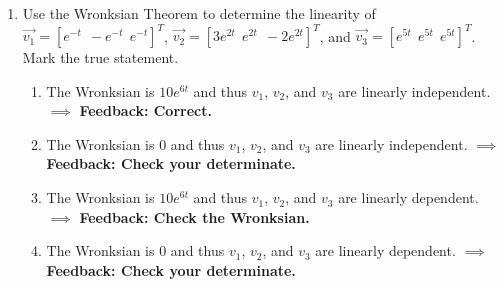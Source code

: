 \documentclass[11pt]{article}
\begin{document}
\begin{enumerate}
\begin{enumerate}
	\end{enumerate}
\newpage
	\item Use the Wronksian Theorem to determine the linearity of $\vec{v_1} = [e^{-t} \:\: -e^{-t} \:\: e^{-t}]^T$, $\vec{v_2} = [3e^{2t} \:\: e^{2t}\:\: -2e^{2t}]^T$, and $\vec{v_3} = [e^{5t} \:\: e^{5t}\:\:e^{5t}]^T$. Mark the true statement. 
	\begin{enumerate}
		\item The Wronksian is $10e^{6t}$ and thus $v_1$, $v_2$, and $v_3$ are linearly independent. $\implies$ \textbf{Feedback: Correct.}
		\item The Wronksian is $0$ and thus $v_1$, $v_2$, and $v_3$ are linearly independent. $\implies$ \textbf{Feedback: Check your determinate.}
		\item The Wronksian is $10e^{6t}$ and thus $v_1$, $v_2$, and $v_3$ are linearly dependent. $\implies$ \textbf{Feedback: Check the Wronksian.}
		\item The Wronksian is $0$ and thus $v_1$, $v_2$, and $v_3$ are linearly dependent. $\implies$ \textbf{Feedback: Check your determinate.}
	\end{enumerate}
\end{enumerate}
\end{document}
